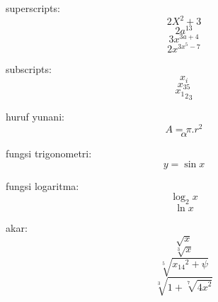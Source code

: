 \documentclass[11pt]{article}
\begin{document}
superscripts: $$2X^2+3$$
$$2a^{13}$$
$$3x^{3a+4}$$
$$2x^{3x^5-7}$$

subscripts:
$$x_i$$
$$x_{35}$$
$${{x_1}_2}_3$$

huruf yunani:
$$A=\pi.r^2$$
$$\alpha$$

fungsi trigonometri:
$$y=\sin{x}$$

fungsi logaritma:
$$\log_2{x}$$
$$\ln{x}$$

akar:
$$\sqrt{x}$$
$$\sqrt[3]{x}$$
$$\sqrt[5]{{x_{14}}^2+\psi}$$
$$\sqrt[3]{1+\sqrt[7]{{4x}^2}}$$
\end{document}
